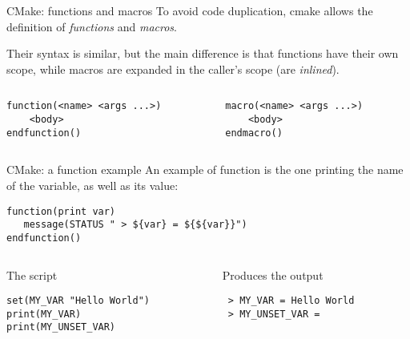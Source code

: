 \begin{frame}[fragile]{CMake: functions and macros}
    To avoid code duplication, cmake allows the definition of \emph{functions} and \emph{macros}. 

    Their syntax is similar, but the main difference is that functions have their own scope, while macros are expanded in the caller's scope (are \textit{inlined}).

    \begin{columns}[c]
      \begin{column}{0.48\textwidth}
\begin{lstlisting}
function(<name> <args ...>)
    <body>
endfunction()
\end{lstlisting}
      \end{column}
      \begin{column}{0.46\textwidth}
\begin{lstlisting}
macro(<name> <args ...>)
    <body>
endmacro()
\end{lstlisting}
      \end{column}
    \end{columns}
    
\end{frame}

\begin{frame}[fragile]{CMake: a function example}
    An example of function is the one printing the name of the variable, as well as its value:
\begin{lstlisting}
function(print var)    
   message(STATUS " > ${var} = ${${var}}") 
endfunction()
\end{lstlisting} \vspace{3mm}

    \begin{columns}[t]
      \begin{column}{0.48\textwidth}
          The script
\begin{lstlisting}
set(MY_VAR "Hello World")
print(MY_VAR)
print(MY_UNSET_VAR)
\end{lstlisting}
      \end{column}
      \begin{column}{0.46\textwidth}
          Produces the output
          \begin{verbatim}
 > MY_VAR = Hello World
 > MY_UNSET_VAR =\end{verbatim}
      \end{column}
    \end{columns}

\end{frame}

